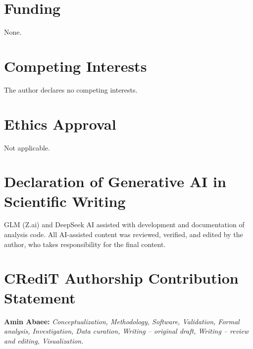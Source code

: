 \documentclass[11pt,a4paper]{article}
\theoremstyle{plain}
\theoremstyle{definition}
\theoremstyle{remark}
\begin{document}
\section*{Funding}
None.

\section*{Competing Interests}
The author declares no competing interests.

\section*{Ethics Approval}
Not applicable.

\section*{Declaration of Generative AI in Scientific Writing}
GLM (Z.ai) and DeepSeek AI assisted with development and
documentation of analysis code. All AI-assisted content was reviewed,
verified, and edited by the author, who takes responsibility for the
final content.

\section*{CRediT Authorship Contribution Statement}
\textbf{Amin Abaee:} \emph{Conceptualization, Methodology, Software,
Validation, Formal analysis, Investigation, Data curation, Writing --
original draft, Writing -- review and editing, Visualization.}


\end{document}
